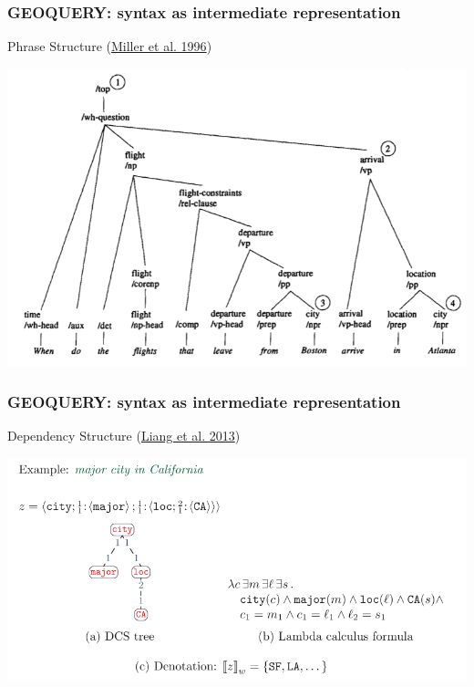 \documentclass[ignorenonframetext]{beamer}
\begin{document}
\begin{frame}\frametitle{GEOQUERY: syntax as intermediate representation}
Phrase Structure
(\href{http://acl.ldc.upenn.edu/P/P96/P96-1008.pdf}{Miller et al. 1996})
\begin{center}
\href{http://acl.ldc.upenn.edu/P/P96/P96-1008.pdf}{
\includegraphics[width=.9\textwidth]{images/miller-ps.png}}
\end{center}
\end{frame}

\begin{frame}\frametitle{GEOQUERY: syntax as intermediate representation}
Dependency Structure
(\href{http://aclweb.org/anthology/J/J13/J13-2005.pdf}{Liang et al. 2013})
\begin{center}
\href{http://aclweb.org/anthology/J/J13/J13-2005.pdf}{
\includegraphics[width=\textwidth]{images/liang-dep.png}}
\end{center}
\end{frame}
\end{document}
